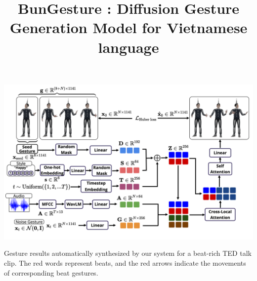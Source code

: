 \documentclass[sigconf]{acmart}
\begin{document}
\title{BunGesture : Diffusion Gesture Generation Model for Vietnamese language}










\begin{teaserfigure}
  \includegraphics[width=\textwidth]{figures/architecture_diffusion.png}
  \caption{Gesture results automatically synthesized by our system for a beat-rich TED talk clip. The red words represent beats, and the red arrows indicate the movements of corresponding beat gestures.}
  \label{fig:teaser}
\end{teaserfigure}

\maketitle
\end{document}
